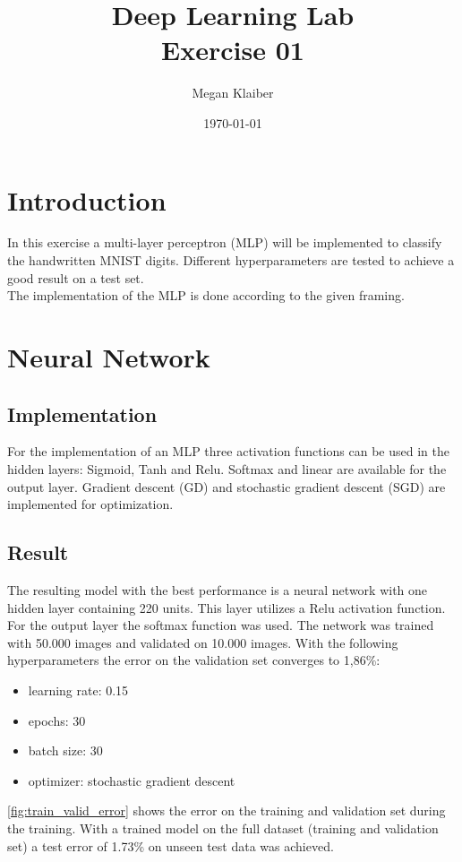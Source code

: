 \documentclass[a4paper,12pt]{article}
\begin{document}
\title{Deep Learning Lab \\ Exercise 01 }
\author{Megan Klaiber}
\date{\today}
\maketitle
\section{Introduction}
In this exercise a multi-layer perceptron (MLP) will be implemented to classify the handwritten MNIST digits. Different hyperparameters are tested to achieve a good result on a test set.\\
The implementation of the MLP is done according to the given framing.


\section{Neural Network}
\subsection{Implementation}
For the implementation of an MLP three activation functions can be used in the hidden layers: Sigmoid, Tanh and Relu. Softmax and linear are available for the output layer. Gradient descent (GD) and stochastic gradient descent (SGD) are implemented for optimization.

\subsection{Result}\label{result}
The resulting model with the best performance is a neural network with one hidden layer containing 220 units. This layer utilizes a Relu activation function. For the output layer the softmax function was used. The network was trained with 50.000 images and validated on 10.000 images. With the following hyperparameters the error on the validation set converges to 1,86\%:

\begin{itemize}
	\item learning rate: 0.15
	\item epochs: 30
	\item batch size: 30
	\item optimizer: stochastic gradient descent
\end{itemize}

\autoref{fig:train_valid_error} shows the error on the training and validation set during the training. With a trained model on the full dataset (training and validation set) a test error of 1.73\% on unseen test data was achieved.
\end{document}
